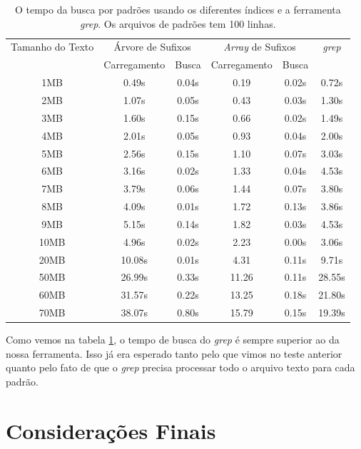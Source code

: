 \documentclass[]{article}
\begin{document}
\begin{table}
	\begin{tabular}{c|c|c|c|c|c}
		Tamanho do Texto & \multicolumn{2}{c|}{Árvore de Sufixos} & \multicolumn{2}{c|}{\textit{Array} de Sufixos} & \textit{grep} \\
						 & 		Carregamento & Busca			  &			 Carregamento & Busca				   & \\
		\hline
   1MB &  0.49s  & 0.04s &  0.19 & 0.02s &  0.72s  \\    
   2MB &  1.07s  & 0.05s &  0.43 & 0.03s &  1.30s  \\    
   3MB &  1.60s  & 0.15s &  0.66 & 0.02s &  1.49s  \\    
   4MB &  2.01s  & 0.05s &  0.93 & 0.04s &  2.00s  \\    
   5MB &  2.56s  & 0.15s &  1.10 & 0.07s &  3.03s  \\    
   6MB &  3.16s  & 0.02s &  1.33 & 0.04s &  4.53s  \\    
   7MB &  3.79s  & 0.06s &  1.44 & 0.07s &  3.80s  \\    
   8MB &  4.09s  & 0.01s &  1.72 & 0.13s &  3.86s  \\    
   9MB &  5.15s  & 0.14s &  1.82 & 0.03s &  4.53s  \\    
  10MB &  4.96s  & 0.02s &  2.23 & 0.00s &  3.06s  \\    
  20MB & 10.08s  & 0.01s &  4.31 & 0.11s &  9.71s  \\    
  50MB & 26.99s  & 0.33s & 11.26 & 0.11s & 28.55s  \\    
  60MB & 31.57s  & 0.22s & 13.25 & 0.18s & 21.80s  \\    
  70MB & 38.07s  & 0.80s & 15.79 & 0.15s & 19.39s  \\    
	\end{tabular}
\caption{O tempo da busca por padrões usando os diferentes índices e a ferramenta \textit{grep}. Os arquivos de padrões tem 100 linhas.}
\label{tab:t3}
\end{table}


Como vemos na tabela \ref{tab:t3}, o tempo de busca do \textit{grep} é sempre superior ao da nossa ferramenta. Isso já era esperado tanto pelo que vimos no teste anterior quanto pelo fato de que o \textit{grep} precisa processar todo o arquivo texto para cada padrão.

\section{Considerações Finais}
\end{document}
